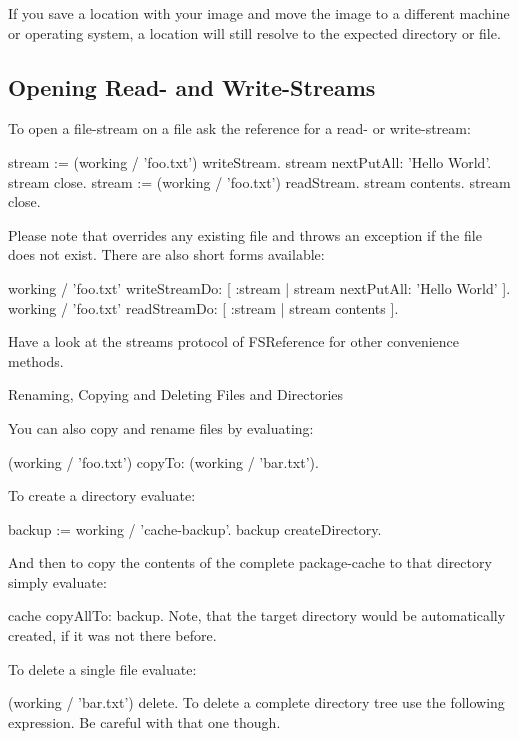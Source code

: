 \documentclass[a4paper,10pt,twoside]{book}
\begin{document}
If you save a location with your image and move the image to a different machine or operating system, a location will still resolve to the expected directory or file.

\subsection{Opening Read- and Write-Streams}

To open a file-stream on a file ask the reference for a read- or write-stream:

\begin{code}{}
 stream := (working / 'foo.txt') writeStream.
 stream nextPutAll: 'Hello World'.
 stream close.
 stream := (working / 'foo.txt') readStream.
 stream contents.
 stream close.
\end{code}

Please note that  overrides any existing file and  throws an exception if the file does not exist. There are also short forms available:

\begin{code}{}
 working / 'foo.txt' writeStreamDo: [ :stream | stream nextPutAll: 'Hello World' ].
 working / 'foo.txt' readStreamDo: [ :stream | stream contents ].
\end{code}

Have a look at the streams protocol of FSReference for other convenience methods.

Renaming, Copying and Deleting Files and Directories

You can also copy and rename files by evaluating:

\begin{code}{}
 (working / 'foo.txt') copyTo: (working / 'bar.txt').
\end{code} 

To create a directory evaluate:
\begin{code}{}
 backup := working / 'cache-backup'.
 backup createDirectory.
\end{code} 

And then to copy the contents of the complete package-cache to that directory simply evaluate:

 cache copyAllTo: backup.
Note, that the target directory would be automatically created, if it was not there before.

To delete a single file evaluate:

 (working / 'bar.txt') delete.
To delete a complete directory tree use the following expression. Be careful with that one though.
\end{document}
